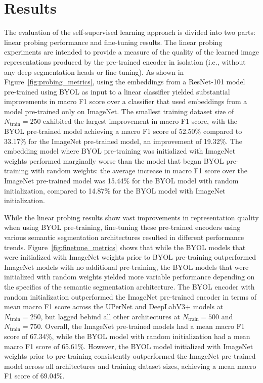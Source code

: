 \section{Results}\label{sec:results}

The evaluation of the self-supervised learning approach is divided into two parts: linear probing performance and fine-tuning results.
The linear probing experiments are intended to provide a measure of the quality of the learned image representations produced by the pre-trained encoder in isolation (i.e., without any deep segmentation heads or fine-tuning).
As shown in Figure~\ref{fig:probing_metrics}, using the embeddings from a ResNet-101 model pre-trained using BYOL as input to a linear classifier yielded substantial improvements in macro F1 score over a classifier that used embeddings from a model pre-trained only on ImageNet.
The smallest training dataset size of \(N_\text{train} = 250\) exhibited the largest improvement in macro F1 score, with the BYOL pre-trained model achieving a macro F1 score of \num{52.50}\% compared to \num{33.17}\% for the ImageNet pre-trained model, an improvement of \num{19.32}\%.
The embedding model where BYOL pre-training was initialized with ImageNet weights performed marginally worse than the model that began BYOL pre-training with random weights: the average increase in macro F1 score over the ImageNet pre-trained model was \num{15.44}\% for the BYOL model with random initialization, compared to \num{14.87}\% for the BYOL model with ImageNet initialization.



While the linear probing results show vast improvements in representation quality when using BYOL pre-training, fine-tuning these pre-trained encoders using various semantic segmentation architectures resulted in different performance trends.
Figure~\ref{fig:finetune_metrics} shows that while the BYOL models that were initialized with ImageNet weights prior to BYOL pre-training outperformed ImageNet models with no additional pre-training, the BYOL models that were initialized with random weights yielded more variable performance depending on the specifics of the semantic segmentation architecture.
The BYOL encoder with random initialization outperformed the ImageNet pre-trained encoder in terms of mean macro F1 score across the UPerNet and DeepLabV3+ models at \(N_\text{train} = 250\), but lagged behind all other architectures at \(N_\text{train} = 500\) and \(N_\text{train} = 750\).
Overall, the ImageNet pre-trained models had a mean macro F1 score of \num{67.34}\%, while the BYOL model with random initialization had a mean macro F1 score of \num{65.61}\%.
However, the BYOL model initialized with ImageNet weights prior to pre-training consistently outperformed the ImageNet pre-trained model across all architectures and training dataset sizes, achieving a mean macro F1 score of \num{69.04}\%.


